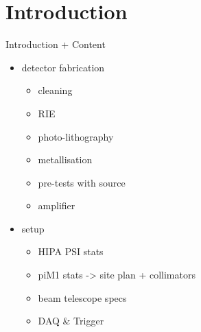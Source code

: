 \section{Introduction}
\begin{frame}{Introduction + Content}

	\begin{itemize}\itemfill
		\item detector fabrication
		\begin{itemize}
      \item cleaning 
      \item RIE 
      \item photo-lithography
      \item metallisation 
      \item pre-tests with source
      \item amplifier
		\end{itemize}
		\item setup
		\begin{itemize}
      \item HIPA PSI stats
      \item piM1 stats -> site plan + collimators
      \item beam telescope specs
      \item DAQ \& Trigger
		\end{itemize}
	\end{itemize}
	
\end{frame}
